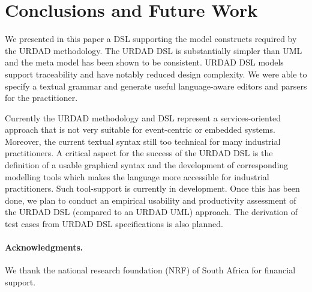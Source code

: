 \section{Conclusions and Future Work \label{sec:conclusionsAndOutlook}}

We presented in this paper a DSL supporting the model constructs required by the URDAD methodology. The URDAD DSL is substantially simpler than UML and the meta model has been shown to be consistent. URDAD DSL models support traceability and have notably reduced design complexity. We were able to specify a textual grammar and generate useful language-aware editors and parsers for the practitioner.


Currently the URDAD methodology and DSL represent a services-oriented approach that is not very suitable for event-centric or embedded systems. Moreover, the current textual syntax still too technical for many industrial practitioners. A critical aspect for the success of the URDAD DSL is the definition of a usable graphical syntax and the development of corresponding modelling tools which makes the language more accessible for industrial practitioners. Such tool-support is currently in development. Once this has been done, we plan to conduct an empirical usability and productivity assessment of the URDAD DSL (compared to an URDAD UML) approach. The derivation of test cases from URDAD DSL specifications is also planned.

\paragraph{Acknowledgments.} We thank the national research 
foundation (NRF) of South Africa for financial support.

